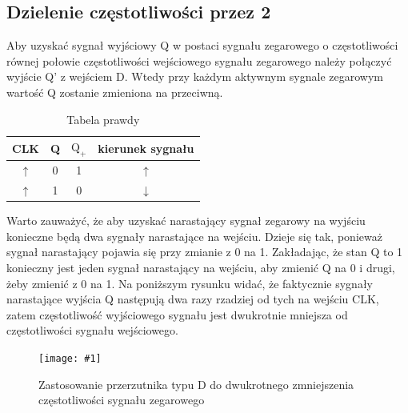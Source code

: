 \documentclass{article}
\newcommand{\image}[3]{
    \begin{figure}[H]
        \centering
        \captionsetup{font=small, skip=2pt}
        \texttt{[image: \#1]}
        \caption{#2}
    \end{figure}
}
\begin{document}
    \subsection{Dzielenie częstotliwości przez 2}
    Aby uzyskać sygnał wyjściowy Q w postaci sygnału zegarowego o częstotliwości równej połowie częstotliwości
    wejściowego sygnału zegarowego należy połączyć wyjście Q' z wejściem D. Wtedy przy każdym aktywnym sygnale zegarowym
    wartość Q zostanie zmieniona na przeciwną.

    \begin{table}[H]
        \centering
        \captionsetup{font=small, skip=2pt}
        \caption{Tabela prawdy}
        \begin{tabular}{|c|c|c|c|}
            \hline
            CLK & Q & \(\mbox{Q}_+\) & kierunek sygnału \\
            \hline
            \(\uparrow\) & 0 & 1 & \(\uparrow\) \\
            \(\uparrow\) & 1 & 0 & \(\downarrow\)\\
            \hline
        \end{tabular}
    \end{table}

    Warto zauważyć, że aby uzyskać narastający sygnał zegarowy na wyjściu konieczne będą dwa sygnały narastające na wejściu.
    Dzieje się tak, ponieważ sygnał narastający pojawia się przy zmianie z 0 na 1. Zakładając, że stan Q to 1
    konieczny jest jeden sygnał narastający na wejściu, aby zmienić Q na 0 i drugi, żeby zmienić z 0 na 1.
    Na poniższym rysunku widać, że faktycznie sygnały narastające wyjścia Q następują dwa razy rzadziej od tych
    na wejściu CLK, zatem częstotliwość wyjściowego sygnału jest dwukrotnie mniejsza od częstotliwości sygnału wejściowego.
    
    \image{images/czestotliwosc_na_2}{Zastosowanie przerzutnika typu D do dwukrotnego zmniejszenia częstotliwości sygnału zegarowego}{scale=0.5}
\end{document}
